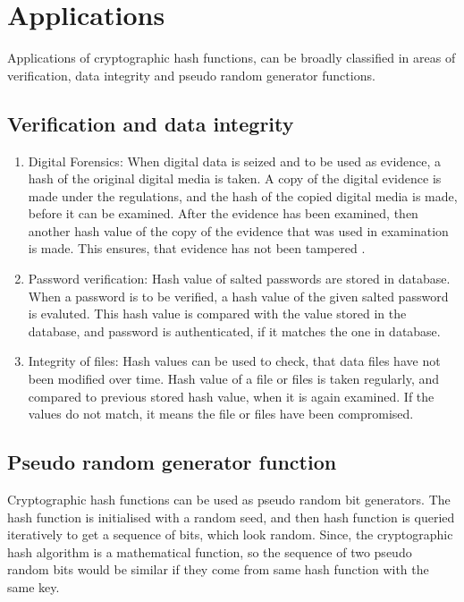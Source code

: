 \section{Applications}

Applications of cryptographic hash functions, can be broadly classified in areas of verification, data
integrity and pseudo random generator functions.

  \subsection{Verification and data integrity}
  \begin{enumerate}

    \item Digital Forensics: When digital data is seized and to be used as evidence, a hash of the original
    digital media is taken. A copy of the digital evidence is made under the regulations, and the hash of the
    copied digital media is made, before it can be examined. After the evidence has been examined, then another
    hash value of the copy of the evidence that was used in examination is made. This ensures, that evidence
    has not been tampered \cite{00013}.

    \item Password verification: Hash value of salted passwords are stored in database. When a password is to be
    verified, a hash value of the given salted password is evaluted. This hash value is compared
    with the value stored in the database, and password is authenticated, if it matches the one in database.

    \item Integrity of files: Hash values can be used to check, that data files have not been modified over
    time. Hash value of a file or files is taken regularly, and compared to previous stored hash value, when it is
    again examined. If the values do not match, it means the file or files have been compromised.
  \end{enumerate}

  \subsection{Pseudo random generator function}
  Cryptographic hash functions can be used as pseudo random bit generators. The hash function is initialised
  with a random seed, and then hash function is queried iteratively to get a sequence of bits, which look random.
  Since, the cryptographic hash algorithm is a mathematical function, so the sequence of two pseudo random bits 
  would be similar if they come from same hash function with the same key.
